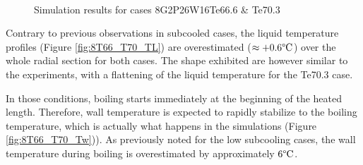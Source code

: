 \begin{figure}[!h]
\centering
{}
\\
\caption{Simulation results for cases 8G2P26W16Te66.6 \& Te70.3}
\label{fig:deb_cfd_8T66_T70}
\end{figure}


Contrary to previous observations in subcooled cases, the liquid temperature profiles (Figure \ref{fig:8T66_T70_TL}) are overestimated ($\approx +0.6\degree\mathrm{C}$) over the whole radial section for both cases. The shape exhibited are however similar to the experiments, with a flattening of the liquid temperature for the Te70.3 case.

\npar

In those conditions, boiling starts immediately at the beginning of the heated length. Therefore, wall temperature is expected to rapidly stabilize to the boiling temperature, which is actually what happens in the simulations (Figure \ref{fig:8T66_T70_Tw})). As previously noted for the low subcooling cases, the wall temperature during boiling is overestimated by approximately $6\degree\mathrm{C}$. 

